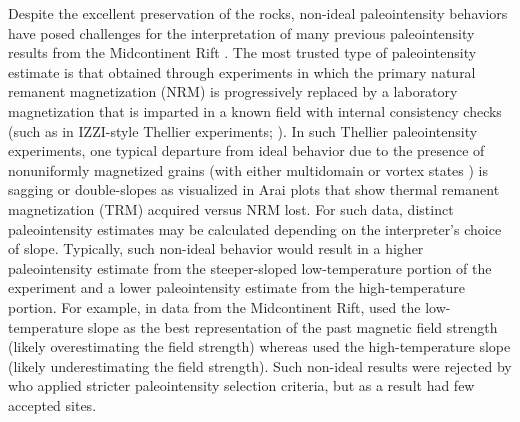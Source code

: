 Despite the excellent preservation of the rocks, non-ideal paleointensity behaviors have posed challenges for the interpretation of many previous paleointensity results from the Midcontinent Rift \citep{Pesonen1983a, Kulakov2013a, Sprain2018a}. The most trusted type of paleointensity estimate is that obtained through experiments in which the primary natural remanent magnetization (NRM) is progressively replaced by a laboratory magnetization that is imparted in a known field with internal consistency checks (such as in IZZI-style Thellier experiments;  \citealp{Yu2004a}). In such Thellier paleointensity experiments, one typical departure from ideal behavior due to the presence of nonuniformly magnetized grains (with either multidomain \citep{Dunlop2001a} or vortex states \citep{Tauxe2020a}) is sagging or double-slopes as visualized in Arai plots that show thermal remanent magnetization (TRM) acquired versus NRM lost. For such data, distinct paleointensity estimates may be calculated depending on the interpreter's choice of slope. Typically, such non-ideal behavior would result in a higher paleointensity estimate from the steeper-sloped low-temperature portion of the experiment and a lower paleointensity estimate from the high-temperature portion. For example, in data from the Midcontinent Rift, \citealp{Pesonen1983a} used the low-temperature slope as the best representation of the past magnetic field strength (likely overestimating the field strength) whereas \citealp{Kulakov2013a} used the high-temperature slope (likely underestimating the field strength). Such non-ideal results were rejected by \citealp{Sprain2018a} who applied stricter paleointensity selection criteria, but as a result had few accepted sites.

